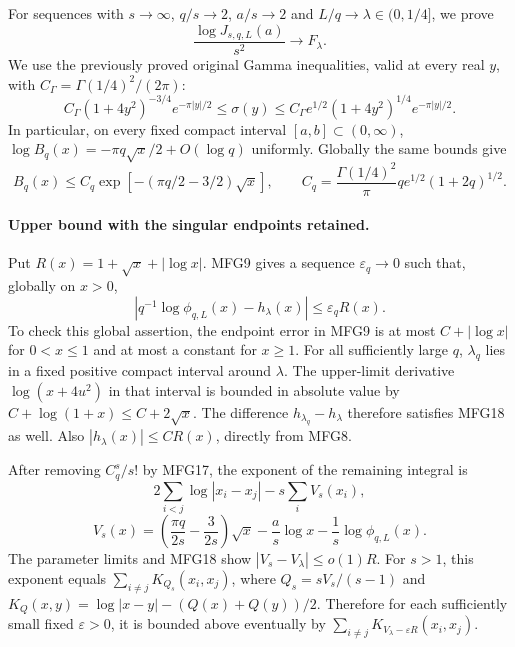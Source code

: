 \documentclass[11pt,a4paper]{article}
\begin{document}
For sequences with $s\to\infty$, $q/s\to2$, $a/s\to2$ and
$L/q\to\lambda\in(0,1/4]$, we prove
\[
 \boxed{\frac{\log J_{s,q,L}(a)}{s^2}\longrightarrow F_\lambda.}
 \tag{MFG15}
\]
We use the previously proved original Gamma inequalities, valid at every
real $y$, with $C_\Gamma=\Gamma(1/4)^2/(2\pi)$:
\[
 C_\Gamma(1+4y^2)^{-3/4}e^{-\pi|y|/2}
 \le\sigma(y)\le
 C_\Gamma e^{1/2}(1+4y^2)^{1/4}e^{-\pi|y|/2}.
 \tag{MFG16}
\]
In particular, on every fixed compact interval $[a,b]\subset(0,\infty)$,
$\log B_q(x)=-\pi q\sqrt x/2+O(\log q)$ uniformly. Globally the
same bounds give
\[
 B_q(x)\le C_q\exp[-(\pi q/2-3/2)\sqrt x],
 \qquad C_q=\frac{\Gamma(1/4)^2}{\pi}
                     q e^{1/2}(1+2q)^{1/2}.
 \tag{MFG17}
\]

\paragraph{Upper bound with the singular endpoints retained.}
Put $R(x)=1+\sqrt x+|\log x|$. MFG9 gives a sequence
$\varepsilon_q\to0$ such that, globally on $x>0$,
\[
 \left|q^{-1}\log\phi_{q,L}(x)-h_\lambda(x)\right|
                  \le\varepsilon_q R(x).
 \tag{MFG18}
\]
To check this global assertion, the endpoint error in MFG9 is at most
$C+|\log x|$ for $0<x\le1$ and at most a constant for $x\ge1$.
For all sufficiently large $q$, $\lambda_q$ lies in a fixed positive
compact interval around $\lambda$. The upper-limit derivative
$\log(x+4u^2)$ in that interval is bounded in absolute value by
$C+\log(1+x)\le C+2\sqrt x$. The difference
$h_{\lambda_q}-h_\lambda$ therefore satisfies MFG18 as well.
Also $|h_\lambda(x)|\le C R(x)$, directly from MFG8.

After removing $C_q^s/s!$ by MFG17, the exponent of the remaining
integral is
\[
 2\sum_{i<j}\log|x_i-x_j|-s\sum_i V_s(x_i),
\]
\[
 V_s(x)=\left(\frac{\pi q}{2s}-\frac3{2s}\right)\sqrt x
        -\frac as\log x-\frac1s\log\phi_{q,L}(x).
\]
The parameter limits and MFG18 show
$|V_s-V_\lambda|\le o(1)R$. For $s>1$, this exponent equals
$\sum_{i\ne j}K_{Q_s}(x_i,x_j)$, where $Q_s=sV_s/(s-1)$ and
$K_Q(x,y)=\log|x-y|-(Q(x)+Q(y))/2$. Therefore for each sufficiently
small fixed $\varepsilon>0$, it is bounded above eventually by
$\sum_{i\ne j}K_{V_\lambda-\varepsilon R}(x_i,x_j)$.
\end{document}
